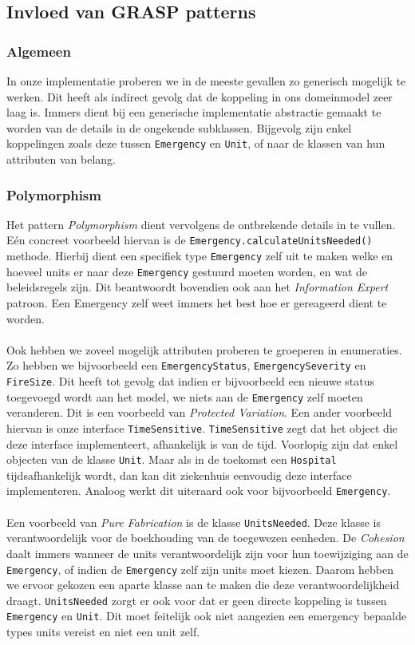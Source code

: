\label{patterns}
\subsection{Invloed van GRASP patterns}
\label{grasppatterns}
\subsubsection{Algemeen}
In onze implementatie proberen we in de meeste gevallen zo generisch mogelijk te werken. Dit heeft als indirect gevolg dat de koppeling in ons domeinmodel zeer laag is. Immers dient bij een generische implementatie abstractie gemaakt te worden van de details in de ongekende subklassen. Bijgevolg zijn enkel koppelingen zoals deze tussen \texttt{Emergency} en \texttt{Unit}, of naar de klassen van hun attributen van belang.
\subsubsection{Polymorphism}
Het pattern \textit{Polymorphism} dient vervolgens de ontbrekende details in te vullen. E\'en concreet voorbeeld hiervan is de \texttt{Emergency.calculateUnitsNeeded()} methode. Hierbij dient een specifiek type \texttt{Emergency} zelf uit te maken welke en hoeveel units er naar deze \texttt{Emergency} gestuurd moeten worden, en wat de beleidsregels zijn. Dit beantwoordt bovendien ook aan het \textit{Information Expert} patroon. Een Emergency zelf weet immers het best hoe er gereageerd dient te worden.
\paragraph{}
Ook hebben we zoveel mogelijk attributen proberen te groeperen in enumeraties. Zo hebben we bijvoorbeeld een \texttt{EmergencyStatus}, \texttt{EmergencySeverity} en \texttt{FireSize}. Dit heeft tot gevolg dat indien er bijvoorbeeld een nieuwe status toegevoegd wordt aan het model, we niets aan de \texttt{Emergency} zelf moeten veranderen. Dit is een voorbeeld van \textit{Protected Variation}. Een ander voorbeeld hiervan is onze interface \texttt{TimeSensitive}. \texttt{TimeSensitive} zegt dat het object die deze interface implementeert, afhankelijk is van de tijd. Voorlopig zijn dat enkel objecten van de klasse \texttt{Unit}. Maar als in de toekomst een \texttt{Hospital} tijdsafhankelijk wordt, dan kan dit ziekenhuis eenvoudig deze interface implementeren. Analoog werkt dit uiteraard ook voor bijvoorbeeld \texttt{Emergency}.
\paragraph{}
Een voorbeeld van \textit{Pure Fabrication} is de klasse \texttt{UnitsNeeded}. Deze klasse is verantwoordelijk voor de boekhouding van de toegewezen eenheden. De \textit{Cohesion} daalt immers wanneer de units verantwoordelijk zijn voor hun toewijziging aan de \texttt{Emergency}, of indien de \texttt{Emergency} zelf zijn units moet kiezen. Daarom hebben we ervoor gekozen een aparte klasse aan te maken die deze verantwoordelijkheid draagt. \texttt{UnitsNeeded} zorgt er ook voor dat er geen directe koppeling is tussen \texttt{Emergency} en \texttt{Unit}. Dit moet feitelijk ook niet aangezien een emergency bepaalde types units vereist en niet een unit zelf.
